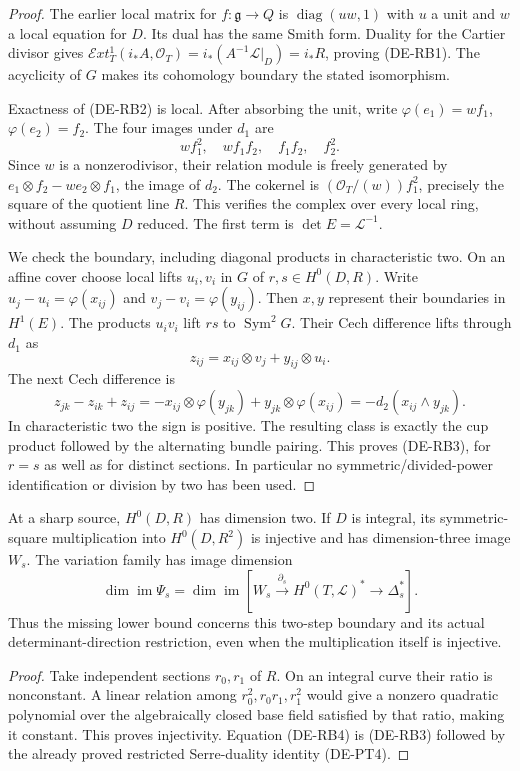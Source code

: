 \begin{proof}
The earlier local matrix for $f:\mathfrak g\to Q$ is
$\operatorname{diag}(uw,1)$ with $u$ a unit and $w$ a local
equation for $D$. Its dual has the same Smith form. Duality for
the Cartier divisor gives
$\mathcal E xt^1_T(i_*A,\mathcal O_T)=i_*(A^{-1}\mathcal L|_D)
=i_*R$, proving (DE-RB1). The acyclicity of $G$ makes its
cohomology boundary the stated isomorphism.

Exactness of (DE-RB2) is local. After absorbing the unit, write
$\varphi(e_1)=wf_1$, $\varphi(e_2)=f_2$. The four images under
$d_1$ are
\[
wf_1^2,\quad wf_1f_2,\quad f_1f_2,\quad f_2^2.
\]
Since $w$ is a nonzerodivisor, their relation module is freely
generated by $e_1\otimes f_2-w e_2\otimes f_1$, the image
of $d_2$. The cokernel is $(\mathcal O_T/(w))f_1^2$, precisely
the square of the quotient line $R$. This verifies the complex
over every local ring, without assuming $D$ reduced. The first
term is $\det E=\mathcal L^{-1}$.

We check the boundary, including diagonal products in
characteristic two. On an affine cover choose local lifts
$u_i,v_i$ in $G$ of $r,s\in H^0(D,R)$. Write
$u_j-u_i=\varphi(x_{ij})$ and
$v_j-v_i=\varphi(y_{ij})$. Then $x,y$ represent their
boundaries in $H^1(E)$. The products $u_iv_i$ lift $rs$ to
$\operatorname{Sym}^2G$. Their Cech difference lifts through
$d_1$ as
\[
z_{ij}=x_{ij}\otimes v_j+y_{ij}\otimes u_i.
\]
The next Cech difference is
\[
z_{jk}-z_{ik}+z_{ij}
=-x_{ij}\otimes\varphi(y_{jk})
  +y_{jk}\otimes\varphi(x_{ij})
=-d_2(x_{ij}\wedge y_{jk}).
\]
In characteristic two the sign is positive. The resulting
class is exactly the cup product followed by the alternating
bundle pairing. This proves (DE-RB3), for $r=s$ as well as
for distinct sections. In particular no symmetric/divided-power
identification or division by two has been used.
\end{proof}

\begin{corollary}
\label{cor:DE-A3-residual-pencil-restriction-candidate}
At a sharp source, $H^0(D,R)$ has dimension two. If $D$ is
integral, its symmetric-square multiplication into $H^0(D,R^2)$
is injective and has dimension-three image $W_s$.
The variation family has image dimension
\[
\dim\operatorname{im}\Psi_s
=\dim\operatorname{im}
\left[W_s\xrightarrow{\partial_s}H^0(T,\mathcal L)^*
\longrightarrow\Delta_s^*\right].
\tag{DE-RB4}
\]
Thus the missing lower bound concerns this two-step boundary
and its actual determinant-direction restriction, even when
the multiplication itself is injective.
\end{corollary}
\begin{proof}
Take independent sections $r_0,r_1$ of $R$. On an integral
curve their ratio is nonconstant. A linear relation among
$r_0^2,r_0r_1,r_1^2$ would give a nonzero quadratic polynomial
over the algebraically closed base field satisfied by that
ratio, making it constant. This proves injectivity.
Equation (DE-RB4) is (DE-RB3) followed by the already proved
restricted Serre-duality identity (DE-PT4).
\end{proof}

